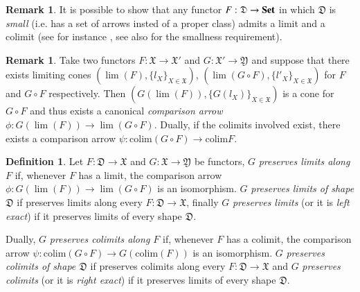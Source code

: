 \documentclass[12pt]{article}
\theoremstyle{definition}
\newtheorem{definition}[lemma]{Definition}
\newtheorem{remark}[lemma]{Remark}
\def\D{\mathfrak D}
\def\X{\mathfrak X}
\def\Y{\mathfrak Y}
\newcommand{\Set}{\textbf{\textup{Set}}}
\numberwithin{equation}{section}
\newcommand{\colim}[0]{\mathrm{colim}}
\begin{document}
 \begin{remark}It is possible to show that any functor $F:\D\rightarrow \Set$ in which $\D$ is \emph{small} (i.e. has a set of arrows insted of a proper class) admits a limit and a colimit (see for instance \cite{cats,mac}, see also \cite[Proposition 2.7.1]{borceux1} for the smallness requirement).
 \end{remark}
 
 \begin{remark}Take two functors $F:\X\rightarrow \X'$ and $G:\X'\rightarrow \Y$ and suppose that there exists limiting cones $(\lim(F), \{l_X\}_{X\in \X})$, $(\lim(G\circ F),\{l'_X\}_{X\in \X})$ for  $F$ and $G\circ F$ respectively. Then $(G(\lim(F)), \{G(l_X)\}_{X\in \X} )$ is a cone for $G\circ F$ and thus exists a canonical \emph{comparison arrow} $\phi:G(\lim(F))\rightarrow \lim (G\circ F)$. Dually, if the colimits involved exist, there exists a comparison arrow $\psi: \colim(G\circ F)\rightarrow \colim F$.
 \end{remark}
 
 \begin{definition}
 Let $F:\D\rightarrow \X$ and $G:\X\rightarrow \Y$ be functors, $G$ \emph{preserves limits along $F$} if, whenever $F$ has a limit, the comparison arrow $\phi:G(\lim(F))\rightarrow \lim (G\circ F)$ is an isomorphism. $G$ \emph{preserves limits of shape $\D$} if preserves limits along every $F:\D\rightarrow \X$, finally $G$ \emph{preserves limits} (or it is \emph{left exact}) if it preserves limits of every shape $\D$.
 
 Dually,  $G$ \emph{preserves colimits along $F$} if, whenever $F$ has a colimit, the comparison arrow $\psi:\colim(G\circ F)\rightarrow G(\colim (F))$ is an isomorphism. $G$ \emph{preserves colimits of shape $\D$} if preserves colimits along every $F:\D\rightarrow \X$ and $G$ \emph{preserves colimits} (or it is \emph{right exact}) if it preserves limits of every shape $\D$.
 \end{definition}
 
\end{document}
